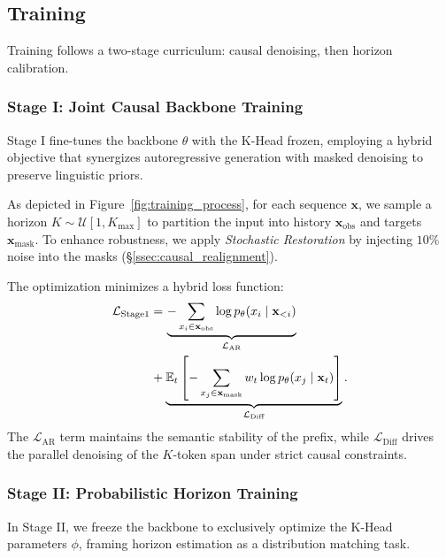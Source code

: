 \documentclass[11pt]{article}
\begin{document}
\subsection{Training}
\label{sec:training}

Training follows a two-stage curriculum: causal denoising, then horizon calibration.

\subsubsection{Stage I: Joint Causal Backbone Training}

Stage I fine-tunes the backbone $\theta$ with the K-Head frozen, employing a hybrid objective that synergizes autoregressive generation with masked denoising to preserve linguistic priors.

As depicted in Figure~\ref{fig:training_process}, for each sequence $\mathbf{x}$, we sample a horizon $K \sim \mathcal{U}[1, K_{\max}]$ to partition the input into history $\mathbf{x}_{\text{obs}}$ and targets $\mathbf{x}_{\text{mask}}$. To enhance robustness, we apply \textit{Stochastic Restoration} by injecting $10\%$ noise into the masks (\S\ref{ssec:causal_realignment}).

The optimization minimizes a hybrid loss function:
\begin{equation}
    \begin{aligned}
    \mathcal{L}_{\text{Stage1}} = & \, \underbrace{-\sum_{x_i \in \mathbf{x}_{\text{obs}}} \log p_\theta(x_i \mid \mathbf{x}_{<i})}_{\mathcal{L}_{\text{AR}}} \\
    & \hspace{-1em} + \underbrace{\mathbb{E}_{t} \left[ -\sum_{x_j \in \mathbf{x}_{\text{mask}}} w_t \log p_\theta(x_j \mid \mathbf{x}_t) \right]}_{\mathcal{L}_{\text{Diff}}}.
    \end{aligned}
\end{equation}
The $\mathcal{L}_{\text{AR}}$ term maintains the semantic stability of the prefix, while $\mathcal{L}_{\text{Diff}}$ drives the parallel denoising of the $K$-token span under strict causal constraints.

\subsubsection{Stage II: Probabilistic Horizon Training}
\label{sssec:stage2}

In Stage II, we freeze the backbone to exclusively optimize the K-Head parameters $\phi$, framing horizon estimation as a distribution matching task.
\end{document}
